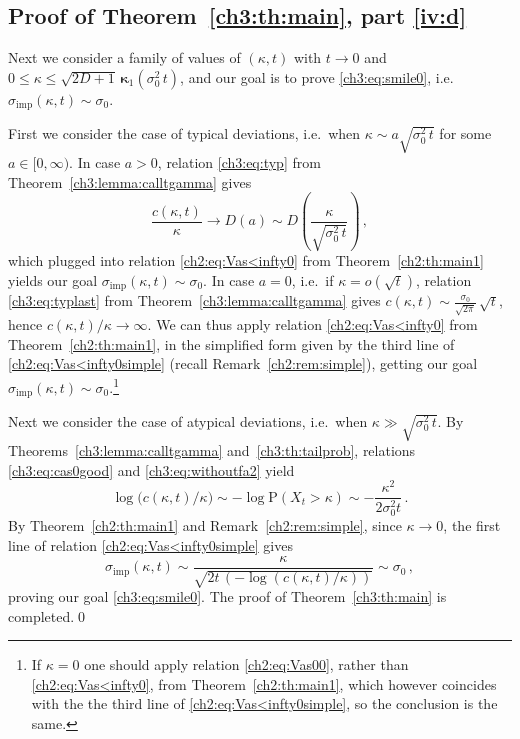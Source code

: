 \documentclass[a4paper,reqno,11pt]{amsart}
\numberwithin{equation}{section}
\newcommand{\PEfont}{\mathrm}
\renewcommand{\P}{\ensuremath{\PEfont P}}
\newcommand\imp{\mathrm{imp}}
\newcommand\bkappa{\boldsymbol{\kappa}}
\begin{document}
\subsection{Proof of Theorem~\ref{ch3:th:main}, part \eqref{iv:d}}

Next we consider a family of values of $(\kappa,t)$ with $t\to 0$ and
$0 \leq \kappa \leq \sqrt{2D+1} \, \bkappa_1( \sigma_0^2 \, t)$, and our goal
is to prove \eqref{ch3:eq:smile0}, i.e.\ $\sigma_\imp(\kappa,t) \sim \sigma_0$.

First we consider the case of typical deviations, i.e.\ when
$\kappa \sim a \sqrt{ \sigma_0^2 \, t}$ for some $a\in[0,\infty)$.
In case $a > 0$, relation \eqref{ch3:eq:typ} from Theorem~\ref{ch3:lemma:calltgamma} gives
\begin{equation*}
	\frac{c(\kappa, t)}{\kappa} \to
 	D\left(a\right)
	\sim D\left(\frac{\kappa}{\sqrt{ \sigma_0^2 \, t}}\right) \,,
\end{equation*}
which plugged into relation \eqref{ch2:eq:Vas<infty0}
from Theorem~\ref{ch2:th:main1} yields our goal
$\sigma_\imp(\kappa,t) \sim \sigma_0$.
In case $a = 0$, i.e.\ if $\kappa = o(\sqrt{t})$,
relation \eqref{ch3:eq:typlast} from Theorem~\ref{ch3:lemma:calltgamma} gives
$c(\kappa, t) \sim \frac{\sigma_0}{\sqrt{2\pi}} \, \sqrt{t}$,
hence $c(\kappa,t)/\kappa \to \infty$. We can thus apply relation
\eqref{ch2:eq:Vas<infty0} from Theorem~\ref{ch2:th:main1},
in the simplified form given by the third line of \eqref{ch2:eq:Vas<infty0simple}
(recall Remark~\ref{ch2:rem:simple}), getting
our goal $\sigma_\imp(\kappa,t) \sim \sigma_0$.\footnote{If $\kappa = 0$ 
one should apply relation \eqref{ch2:eq:Vas00}, rather than \eqref{ch2:eq:Vas<infty0},
from Theorem~\ref{ch2:th:main1}, which however coincides with the
the third line of \eqref{ch2:eq:Vas<infty0simple}, so the conclusion is the same.}

Next we consider the case of atypical deviations, i.e.\ when 
$\kappa \gg \sqrt{ \sigma_0^2 \, t}$.
By Theorems~\ref{ch3:lemma:calltgamma}
and~\ref{ch3:th:tailprob},
relations \eqref{ch3:eq:cas0good} and \eqref{ch3:eq:withoutfa2} yield
\begin{equation*}
\log \big( c(\kappa,t)/\kappa \big) 
	\sim - \log \P(X_t > \kappa)\sim 
	- \frac{\kappa^2}{2\sigma_0^2 t} \,.
\end{equation*}
By Theorem~\ref{ch2:th:main1} and Remark~\ref{ch2:rem:simple},
since $\kappa \to 0$, the first line of relation \eqref{ch2:eq:Vas<infty0simple} gives
\begin{equation*}
	\sigma_\imp(\kappa,t) \sim \frac{\kappa}{\sqrt{2t\, ( - \log ( c(\kappa,t) / \kappa ) )}}
	\sim \sigma_0 \,,
\end{equation*}
proving our goal \eqref{ch3:eq:smile0}.
The proof of Theorem~\ref{ch3:th:main} is completed.\qed
\end{document}
